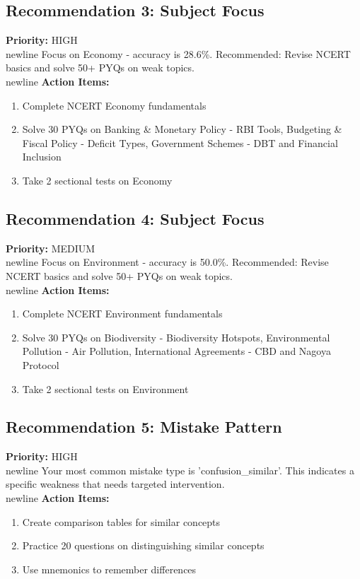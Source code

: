 \documentclass[a4paper,12pt]{article}
\begin{document}
\subsection{Recommendation 3: Subject Focus}
\textbf{Priority:} \textcolor{brandgold}{HIGH}\\newline
Focus on Economy - accuracy is 28.6\%. Recommended: Revise NCERT basics and solve 50+ PYQs on weak topics.\\newline
\textbf{Action Items:}\newline
\begin{enumerate}
\item Complete NCERT Economy fundamentals
\item Solve 30 PYQs on Banking \& Monetary Policy - RBI Tools, Budgeting \& Fiscal Policy - Deficit Types, Government Schemes - DBT and Financial Inclusion
\item Take 2 sectional tests on Economy
\end{enumerate}
\subsection{Recommendation 4: Subject Focus}
\textbf{Priority:} \textcolor{brandgold}{MEDIUM}\\newline
Focus on Environment - accuracy is 50.0\%. Recommended: Revise NCERT basics and solve 50+ PYQs on weak topics.\\newline
\textbf{Action Items:}\newline
\begin{enumerate}
\item Complete NCERT Environment fundamentals
\item Solve 30 PYQs on Biodiversity - Biodiversity Hotspots, Environmental Pollution - Air Pollution, International Agreements - CBD and Nagoya Protocol
\item Take 2 sectional tests on Environment
\end{enumerate}
\subsection{Recommendation 5: Mistake Pattern}
\textbf{Priority:} \textcolor{brandgold}{HIGH}\\newline
Your most common mistake type is 'confusion\_similar'. This indicates a specific weakness that needs targeted intervention.\\newline
\textbf{Action Items:}\newline
\begin{enumerate}
\item Create comparison tables for similar concepts
\item Practice 20 questions on distinguishing similar concepts
\item Use mnemonics to remember differences
\end{enumerate}
\end{document}
